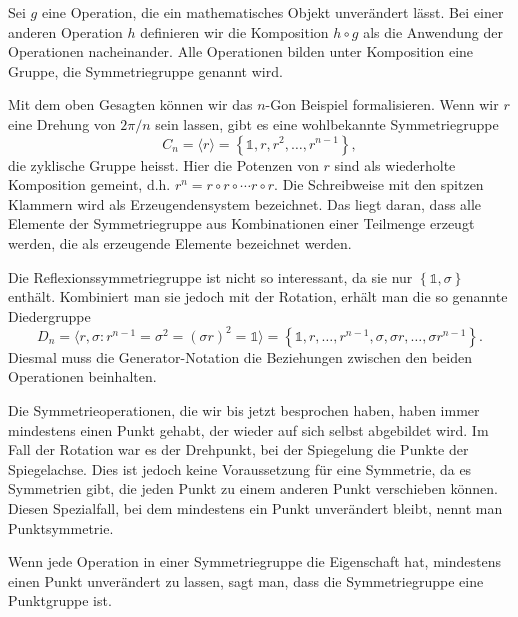 \begin{definition}[Symmetriegruppe]
	Sei \(g\) eine Operation, die ein mathematisches Objekt unverändert lässt.
	Bei einer anderen Operation \(h\) definieren wir die Komposition \(h\circ g\)
	als die Anwendung der Operationen nacheinander. Alle Operationen bilden unter
	Komposition eine Gruppe, die Symmetriegruppe genannt wird.
\end{definition}

Mit dem oben Gesagten können wir das \(n\)-Gon Beispiel formalisieren. Wenn wir
\(r\) eine Drehung von \(2\pi/n\) sein lassen, gibt es eine wohlbekannte Symmetriegruppe
\[
	C_n = \langle r \rangle
		= \left\{\mathds{1}, r, r^2, \ldots, r^{n-1}\right\}, \]
die zyklische Gruppe heisst. Hier die Potenzen von \(r\) sind als wiederholte
Komposition gemeint, d.h. \(r^n = r\circ r \circ \cdots r\circ r\).  Die
Schreibweise mit den spitzen Klammern wird als Erzeugendensystem bezeichnet.
Das liegt daran, dass alle Elemente der Symmetriegruppe aus Kombinationen einer
Teilmenge erzeugt werden, die als erzeugende Elemente bezeichnet werden. 


Die Reflexionssymmetriegruppe ist nicht so interessant, da sie nur
\(\left\{\mathds{1}, \sigma\right\}\) enthält. Kombiniert man sie jedoch mit
der Rotation, erhält man die so genannte Diedergruppe
\[
	D_n = \langle r, \sigma : r^{n-1} = \sigma^2 = (\sigma r)^2 = \mathds{1} \rangle
		= \left\{
				\mathds{1}, r, \ldots, r^{n-1}, \sigma, \sigma r, \ldots, \sigma r^{n-1}
		\right\}.
\]
Diesmal muss die Generator-Notation die Beziehungen zwischen den beiden
Operationen beinhalten. 


Die Symmetrieoperationen, die wir bis jetzt besprochen haben, haben immer
mindestens einen Punkt gehabt, der wieder auf sich selbst abgebildet wird. Im
Fall der Rotation war es der Drehpunkt, bei der Spiegelung die Punkte der
Spiegelachse. Dies ist jedoch keine Voraussetzung für eine Symmetrie, da es
Symmetrien gibt, die jeden Punkt zu einem anderen Punkt verschieben können.
Diesen Spezialfall, bei dem mindestens ein Punkt unverändert bleibt, nennt man
Punktsymmetrie.
\begin{definition}[Punktgruppe]
	Wenn jede Operation in einer Symmetriegruppe die Eigenschaft hat, mindestens
	einen Punkt unverändert zu lassen, sagt man, dass die Symmetriegruppe eine
	Punktgruppe ist.
\end{definition}

